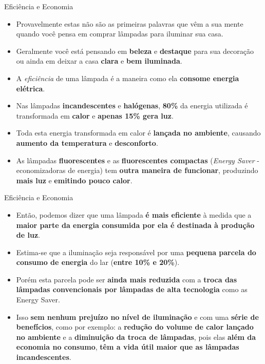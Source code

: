 \begin{frame}{Eficiência e Economia}
	\begin{block}{}
		\begin{itemize}
			\item Provavelmente estas não são as primeiras palavras que vêm a sua mente quando você pensa em comprar lâmpadas para iluminar sua casa.
			\item Geralmente você está pensando em \textbf{beleza} e \textbf{destaque} para sua decoração ou ainda em deixar a casa \textbf{clara} e \textbf{bem iluminada}.
			\item A \textit{eficiência} de uma lâmpada é a maneira como ela \textbf{consome energia elétrica}.
			\item Nas lâmpadas \textbf{incandescentes} e \textbf{halógenas}, \textbf{80\%} da energia utilizada é transformada em \textbf{calor} e \textbf{apenas 15\% gera luz}.
			\item Toda esta energia transformada em calor é \textbf{lançada no ambiente}, causando \textbf{aumento da temperatura} e \textbf{desconforto}.
			\item As lâmpadas \textbf{fluorescentes} e as \textbf{fluorescentes compactas} (\textit{Energy Saver} - economizadoras de energia) tem \textbf{outra maneira de funcionar}, produzindo \textbf{mais luz} e \textbf{emitindo pouco calor}.
		\end{itemize}
	\end{block}
\end{frame}


\begin{frame}{Eficiência e Economia}
	\begin{block}{}
		\begin{itemize}
			\item Então, podemos dizer que uma lâmpada \textbf{é mais eficiente} à medida que a \textbf{maior parte da energia consumida por ela é destinada à produção de luz}.
			\item Estima-se que a iluminação seja responsável por uma \textbf{pequena parcela do consumo de energia} do lar (\textbf{entre 10\% e 20\%}).
			\item Porém esta parcela pode ser \textbf{ainda mais reduzida} com a \textbf{troca das lâmpadas convencionais por lâmpadas de alta tecnologia} como as Energy Saver.
			\item Isso \textbf{sem nenhum prejuízo no nível de iluminação} e com uma \textbf{série de benefícios}, como por exemplo: a \textbf{redução do volume de calor lançado no ambiente} e a \textbf{diminuição da troca de lâmpadas}, pois elas \textbf{além da economia no consumo}, \textbf{têm a vida útil maior que as lâmpadas incandescentes}.
		\end{itemize}
	\end{block}
\end{frame}


